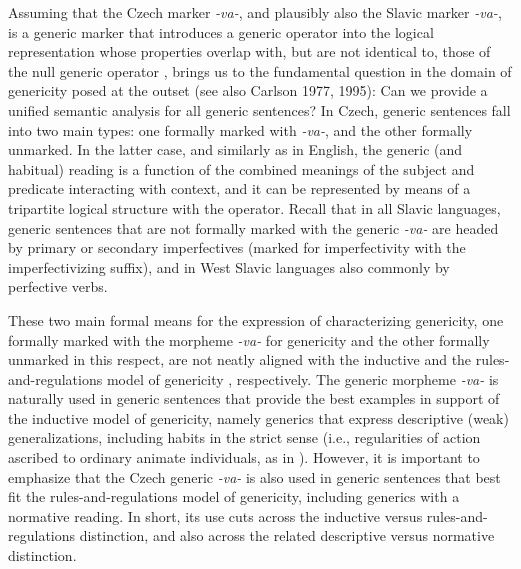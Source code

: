 \documentclass[output=paper,colorlinks,citecolor=brown]{langscibook}
\begin{document}
Assuming that the Czech marker \textit{-va-},
and plausibly also the Slavic marker \textit{-va-}, is a generic marker that introduces a generic operator into the logical representation whose
properties overlap with, but are not identical to, those of the null generic operator , brings us to the fundamental question in the domain of genericity posed at the outset (see also Carlson 1977, 1995): Can we provide a unified semantic analysis for all generic sentences?
In Czech, generic sentences fall into two main types: one formally marked with \textit{-va-}, and the other formally unmarked. In the latter case,
and similarly as in English, the generic (and habitual) reading is a function of the combined meanings of the subject and predicate interacting with context,
and it can be represented by means of a tripartite logical structure with the  operator. Recall that in all Slavic languages,
generic sentences that are not formally marked
with the generic \textit{-va-} are headed by
primary or secondary imperfectives (marked for imperfectivity with the imperfectivizing suffix),
and in West Slavic languages also commonly by perfective verbs.

These two main formal means for the expression of characterizing genericity, one formally marked with the morpheme \textit{-va-} for genericity and the other formally unmarked in this respect, are not neatly aligned with the inductive and the rules-and-regulations model of genericity \citep{carlson1995truth}, respectively.
The generic morpheme \textit{-va-} is naturally used in generic sentences that provide the best examples in support of the inductive model of genericity, namely generics that express descriptive (weak) generalizations, including habits in the strict sense (i.e., regularities of action ascribed to ordinary animate individuals, as in ). However, it is important to emphasize that the Czech generic \textit{-va-} is also used in generic sentences that best fit the rules-and-regulations model of genericity, including generics with a normative reading.
In short, its use cuts across the inductive versus rules-and-regulations distinction, and also across the related descriptive versus normative distinction.
\end{document}
